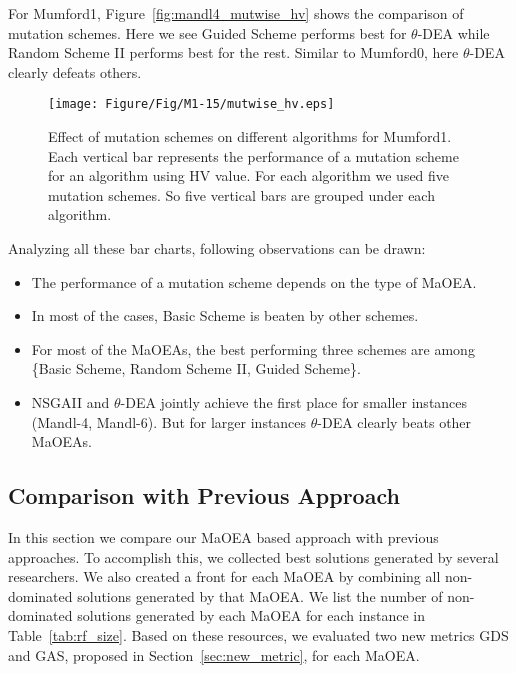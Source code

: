 For Mumford1, Figure~\ref{fig:mandl4_mutwise_hv} shows the comparison of mutation schemes. Here we see Guided Scheme performs best for $\theta$-DEA while Random Scheme II performs best for the rest.  Similar to Mumford0, here $\theta$-DEA clearly defeats others.  

\begin{figure} [!htbp]
	\centering
	\texttt{[image: Figure/Fig/M1-15/mutwise\_hv.eps]}
	\caption{Effect of mutation schemes on different algorithms for Mumford1. Each vertical bar represents the performance of a mutation scheme for an algorithm using HV value. For each algorithm we used five mutation schemes. So five vertical bars are grouped under each algorithm.}\label{fig:m1_mutwise_hv} 
\end{figure}

Analyzing all these bar charts, following observations can be drawn:
\begin{itemize}
	\item The performance of a mutation scheme depends on the type of MaOEA.
	
	\item In most of the cases, Basic Scheme is beaten by other schemes. 

	\item For most of the MaOEAs, the best performing three schemes are among \{Basic Scheme, Random Scheme II, Guided Scheme\}.

	\item NSGAII and $\theta$-DEA jointly achieve the first place for smaller instances (Mandl-4, Mandl-6). But for larger instances $\theta$-DEA clearly beats other MaOEAs.
\end{itemize}

\subsection{Comparison with Previous Approach}

In this section we compare our MaOEA based approach with previous approaches. To accomplish this, we collected best solutions generated by several researchers. We also created a front for each MaOEA by combining all non-dominated solutions generated by that MaOEA. We list the number of non-dominated solutions generated by each MaOEA for each instance in Table~\ref{tab:rf_size}. Based on these resources, we evaluated two new metrics GDS and GAS, proposed in Section~\ref{sec:new_metric}, for each MaOEA.

